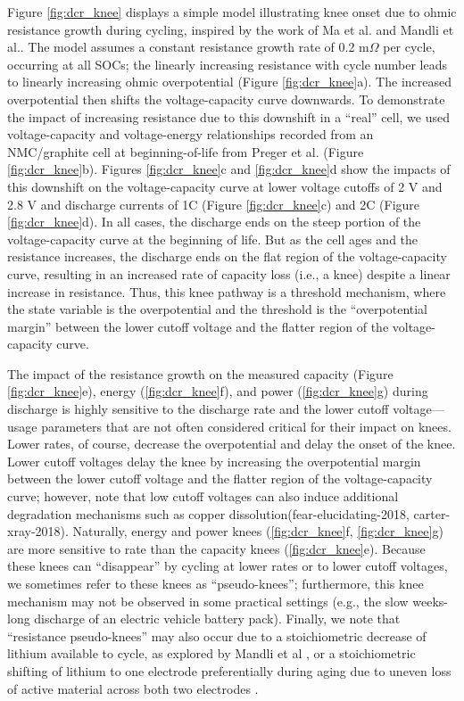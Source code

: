 \documentclass[journal=jpclcd,manuscript=article]{achemso}
\begin{document}
Figure \ref{fig:dcr_knee} displays a simple model illustrating knee onset due to ohmic resistance growth during cycling, inspired by the work of Ma et al.\cite{ma_editors_2019} and Mandli et al.\cite{mandli_analysis_2019}. The model assumes a constant resistance growth rate of 0.2 m$\Omega$ per cycle, occurring at all SOCs; the linearly increasing resistance with cycle number leads to linearly increasing ohmic overpotential (Figure \ref{fig:dcr_knee}a). The increased overpotential then shifts the voltage-capacity curve downwards.
To demonstrate the impact of increasing resistance due to this downshift in a ``real'' cell, we used voltage-capacity and voltage-energy relationships recorded from an NMC/graphite cell at beginning-of-life from Preger et al.\cite{preger_degradation_2020} (Figure \ref{fig:dcr_knee}b). Figures \ref{fig:dcr_knee}c and \ref{fig:dcr_knee}d show the impacts of this downshift on the voltage-capacity curve at lower voltage cutoffs of 2 V and 2.8 V and discharge currents of 1C (Figure \ref{fig:dcr_knee}c) and 2C (Figure \ref{fig:dcr_knee}d). In all cases, the discharge ends on the steep portion of the voltage-capacity curve at the beginning of life. But as the cell ages and the resistance increases, the discharge ends on the flat region of the voltage-capacity curve, resulting in an increased rate of capacity loss (i.e., a knee) despite a linear increase in resistance. Thus, this knee pathway is a threshold mechanism, where the state variable is the overpotential and the threshold is the ``overpotential margin'' between the lower cutoff voltage and the flatter region of the voltage-capacity curve.

The impact of the resistance growth on the measured capacity (Figure \ref{fig:dcr_knee}e), energy (\ref{fig:dcr_knee}f), and power (\ref{fig:dcr_knee}g) during discharge is highly sensitive to the discharge rate and the lower cutoff voltage---usage parameters that are not often considered critical for their impact on knees. Lower rates, of course, decrease the overpotential and delay the onset of the knee. Lower cutoff voltages delay the knee by increasing the overpotential margin between the lower cutoff voltage and the flatter region of the voltage-capacity curve; however, note that low cutoff voltages can also induce additional degradation mechanisms such as copper dissolution(fear-elucidating-2018, carter-xray-2018). Naturally, energy and power knees (\ref{fig:dcr_knee}f, \ref{fig:dcr_knee}g) are more sensitive to rate than the capacity knees (\ref{fig:dcr_knee}e). Because these knees can ``disappear'' by cycling at lower rates or to lower cutoff voltages, we sometimes refer to these knees as ``pseudo-knees''; furthermore, this knee mechanism may not be observed in some practical settings (e.g., the slow weeks-long discharge of an electric vehicle battery pack).
Finally, we note that ``resistance pseudo-knees'' may also occur due to a stoichiometric decrease of lithium available to cycle, as explored by Mandli et al \cite{mandli_analysis_2019}, or a stoichiometric shifting of lithium to one electrode preferentially during aging due to uneven loss of active material across both two electrodes \cite{lin_comprehensive_2013}.
\end{document}
